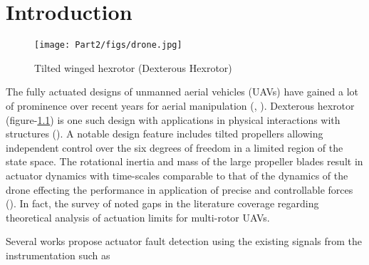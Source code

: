 \chapter{Introduction}


\begin{figure}[H]
        \centering
        \texttt{[image: Part2/figs/drone.jpg]}
        \caption{Tilted winged hexrotor (Dexterous Hexrotor)}
        \label{fig::drone}
\end{figure}


\par The fully actuated designs of unmanned aerial vehicles (UAVs) have gained a lot of prominence over recent years for
aerial manipulation (\cite{ding2021design}, \cite{ryll20176d}). Dexterous hexrotor (figure-\ref{fig::drone}) is one such
design with applications in physical interactions with structures (\cite{jiang2017estimation}). A notable design feature
includes tilted propellers allowing independent control over the six degrees of freedom in a limited region of the state
space. The rotational inertia and mass of the large propeller blades result in actuator dynamics with time-scales
comparable to that of the dynamics of the drone effecting the performance in application of precise and controllable
forces (\cite{hamandi2021design}). In fact, the survey of \cite{hamandi2021design} noted gaps in the literature coverage
regarding theoretical analysis of actuation limits for multi-rotor UAVs.

\par Several works propose actuator fault detection using the existing signals from the instrumentation such as
